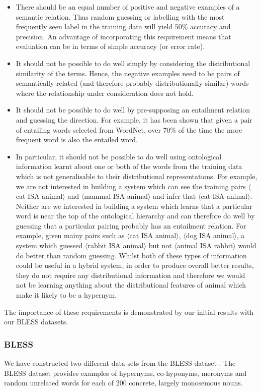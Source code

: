 \documentclass[11pt]{article}
\newcommand\pair[2]{$\langle$#1 ISA #2$\rangle$}
\begin{document}
\begin{itemize}
\item There should be an equal number of positive and negative examples of a semantic relation.  Thus random guessing or labelling with the most frequently seen label in the training data will yield 50\% accuracy and precision.  An advantage of incorporating this requirement means that evaluation can be in terms of simple accuracy (or error rate).
\item It should not be possible to do well simply by considering the distributional similarity of the terms.  Hence, the negative examples need to be pairs of semantically related (and therefore probably distributionally similar) words where the relationship under consideration does not hold.
\item It should not be possible to do well by pre-supposing an entailment relation and guessing the direction.  For example, it has been shown that given a pair of entailing words selected from WordNet, over 70\% of the time the more frequent word is also the entailed word.
\item In particular, it should not be possible to do well using ontological information learnt about one or both of the words from the training data which is not generalisable to their distributional representations.  For example, we are not interested in building a system which can see the training pairs \pair{cat}{animal} and \pair{mammal}{animal} and infer that \pair{cat}{animal}.  Neither are we interested in building a system which learns that a particular word is near the top of the ontological hierarchy and can therefore do well by guessing that a particular pairing probably has an entailment relation.  For example, given mainy pairs such as \pair{cat}{animal}, \pair{dog}{animal}, a system which guessed \pair{rabbit}{animal} but not \pair{animal}{rabbit} would do better than random guessing.  Whilst both of these types of information could be useful in a hybrid system, in order to produce overall better results, they do not require any distributional information and therefore we would not be learning anything about the distributional features of animal which make it likely to be a hypernym.
\end{itemize}

The importance of these requirements is demonstrated by our initial results with our BLESS datasets.

\subsubsection{BLESS}
We have constructed two different data sets from the BLESS dataset \cite{Baroni2011}.  The BLESS dataset provides examples of hypernyms, co-hyponyms, meronyms and random unrelated words for each of 200 concrete, largely monosemous nouns.
\end{document}
